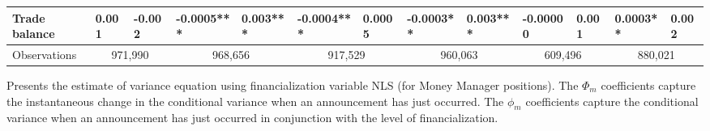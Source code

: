 \begin{landscape}
\begin{table}[]
{\begin{tabular}{lllllllllllll}
Trade balance            & 0.001    & -0.002    & -0.0005*** & 0.003***  & -0.0004*** & 0.0005    & -0.0003** & 0.003*** & -0.00000  & 0.001     & 0.0003**  & 0.002     \\ \hline
Observations &
  \multicolumn{2}{c}{971,990} &
  \multicolumn{2}{c}{968,656} &
  \multicolumn{2}{c}{917,529} &
  \multicolumn{2}{c}{960,063} &
  \multicolumn{2}{c}{609,496} &
  \multicolumn{2}{c}{880,021} \\ \hline
\end{tabular}%
}
 \singlespacing
        \footnotesize
 Presents the estimate of variance equation using financialization variable NLS (for Money Manager positions). The $\Phi_m$ coefficients capture the instantaneous change in the conditional variance when an announcement has just occurred. The $\phi_m$ coefficients capture the conditional variance when an announcement has just occurred in conjunction with the level of financialization.
\end{table}
\end{landscape}

